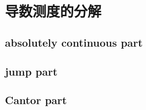 \section{导数测度的分解}
\label{b1:sec:2803}


\subsection{absolutely continuous part}
\label{b1:subsec:280301}

\subsection{jump part}
\label{b1:subsec:280302}

\subsection{Cantor part}
\label{b1:subsec:280303}


